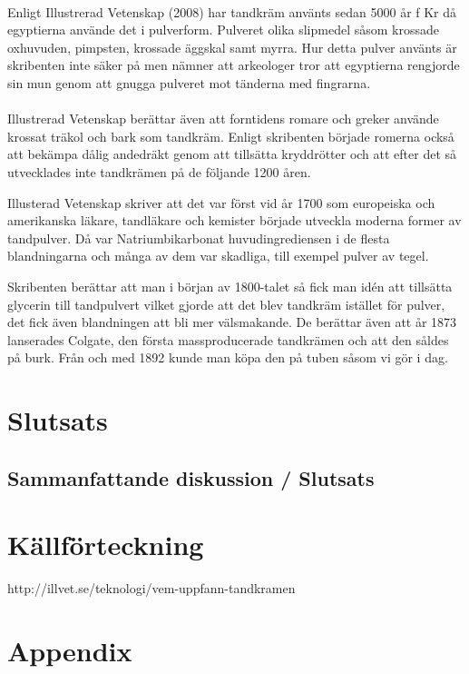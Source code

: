 \documentclass[12pt]{article}
\begin{document}
				\paragraph{}Enligt Illustrerad Vetenskap (2008) har tandkräm använts sedan 5000 år f Kr då egyptierna använde det i pulverform. Pulveret olika slipmedel såsom krossade oxhuvuden, pimpsten, krossade äggskal samt myrra. Hur detta pulver använts är skribenten inte säker på men nämner att arkeologer tror att egyptierna rengjorde sin mun genom att gnugga pulveret mot tänderna med fingrarna.
			
			\paragraph{}Illustrerad Vetenskap berättar även att forntidens romare och greker använde krossat träkol och bark som tandkräm. Enligt skribenten började romerna också att bekämpa dålig andedräkt genom att tillsätta kryddrötter och att efter det så utvecklades inte tandkrämen på de följande 1200 åren.
			
			Illusterad Vetenskap skriver att det var först vid år 1700 som europeiska och amerikanska läkare, tandläkare och kemister började utveckla moderna former av tandpulver. Då var Natriumbikarbonat huvudingrediensen i de flesta blandningarna och många av dem var skadliga, till exempel pulver av tegel. 
			
			Skribenten berättar att man i början av 1800-talet så fick man idén att tillsätta glycerin till tandpulvert vilket gjorde att det blev tandkräm istället för pulver, det fick även blandningen att bli mer välsmakande. De berättar även att år 1873 lanserades Colgate, den första massproducerade tandkrämen och att den såldes på burk. Från och med 1892 kunde man köpa den på tuben såsom vi gör i dag.

	\section{Slutsats}
		\subsection{Sammanfattande diskussion / Slutsats}

	\newpage
	\section{Källförteckning}
	http://illvet.se/teknologi/vem-uppfann-tandkramen
	\newpage
	\section{Appendix}
\end{document}
